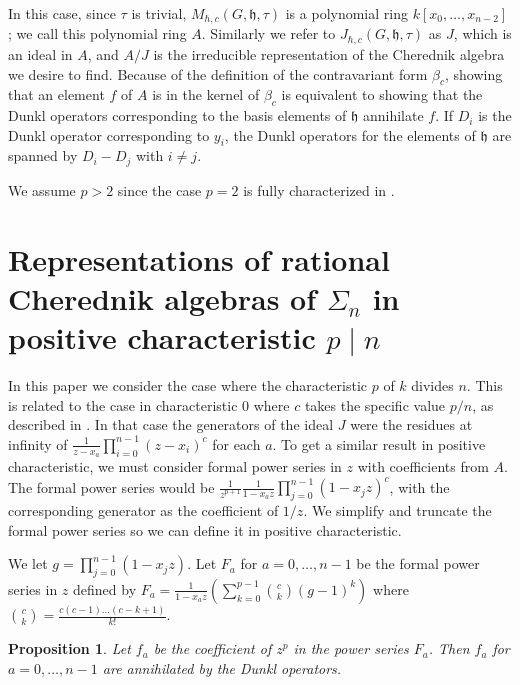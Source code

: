 \documentclass{article}
\numberwithin{equation}{section}
\newtheorem{proposition}[equation]{Proposition}
\newcommand{\h}{\mathfrak{h}}
\begin{document}
In this case, since $\tau$ is trivial, $M_{\hbar,c}(G,\h,\tau)$ is a polynomial ring $k[x_0,\dots,x_{n-2}]$; we call this polynomial ring $A$. Similarly we refer to $J_{\hbar,c}(G,\h,\tau)$ as $J$, which is an ideal in $A$, and $A/J$ is the irreducible representation of the Cherednik algebra we desire to find. Because of the definition of the contravariant form $\beta_c$, showing that an element $f$ of $A$ is in the kernel of $\beta_c$ is equivalent to showing that the Dunkl operators corresponding to the basis elements of $\h$ annihilate $f$. If $D_i$ is the Dunkl operator corresponding to $y_i$, the Dunkl operators for the elements of $\h$ are spanned by $D_i-D_j$ with $i \ne j$. 

We assume $p>2$ since the case $p=2$ is fully characterized in \cite{L}.


\section{Representations of rational Cherednik algebras of $\Sigma_n$ in positive characteristic $p \mid n$}

In this paper we consider the case where the characteristic $p$ of $k$ divides $n$. This is related to the case in characteristic $0$ where $c$ takes the specific value $p/n$, as described in \cite{CE}. In that case the generators of the ideal $J$ were the residues at infinity of $\frac{1}{z-x_a} \prod_{i=0}^{n-1} (z-x_i)^c$ for each $a$. To get a similar result in positive characteristic, we must consider formal power series in $z$ with coefficients from $A$. The formal power series would be $\frac{1}{z^{p+1}}\frac{1}{1-x_az}\prod_{j=0}^{n-1} (1-x_jz)^c$, with the corresponding generator as the coefficient of $1/z$. We simplify and truncate the formal power series so we can define it in positive characteristic.

We let $g=\prod_{j=0}^{n-1} (1-x_jz)$. Let $F_a$ for $a=0,\dots,n-1$ be the formal power series in $z$ defined by $F_a=\frac{1}{1-x_az} \left( \sum_{k=0}^{p-1} \binom{c}{k}(g-1)^k\right)$ where $\binom{c}{k}=\frac{c(c-1)\dots(c-k+1)}{k!}$. 

\begin{proposition}\label{prop:ann} Let $f_a$ be the coefficient of $z^p$ in the power series $F_a$. Then $f_a$ for $a=0,\dots,n-1$ are annihilated by the Dunkl operators. 
\end{proposition}
\end{document}
